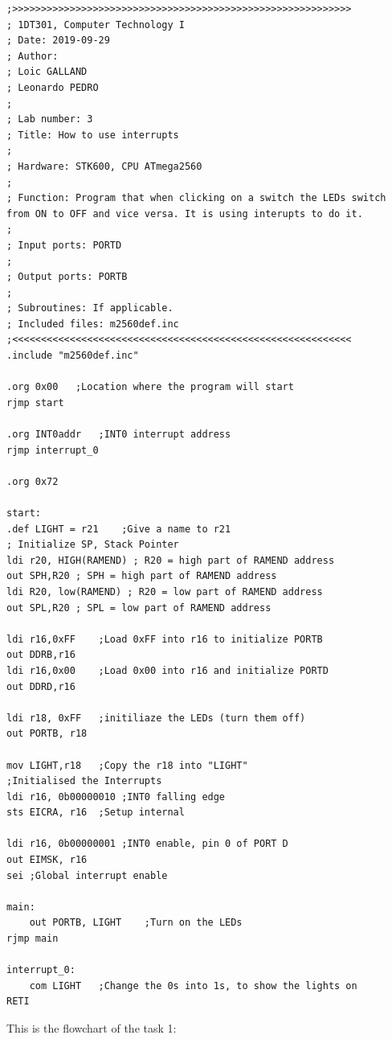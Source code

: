 \documentclass[a4paper,12pt]{article}
\begin{document}
\lstset{style=Asm}
\begin{lstlisting}
;>>>>>>>>>>>>>>>>>>>>>>>>>>>>>>>>>>>>>>>>>>>>>>>>>>>>>>>>>>>
; 1DT301, Computer Technology I
; Date: 2019-09-29
; Author:
; Loic GALLAND
; Leonardo PEDRO
;
; Lab number: 3
; Title: How to use interrupts
;
; Hardware: STK600, CPU ATmega2560
;
; Function: Program that when clicking on a switch the LEDs switch from ON to OFF and vice versa. It is using interupts to do it.
;
; Input ports: PORTD
;
; Output ports: PORTB
;
; Subroutines: If applicable.
; Included files: m2560def.inc
;<<<<<<<<<<<<<<<<<<<<<<<<<<<<<<<<<<<<<<<<<<<<<<<<<<<<<<<<<<<
.include "m2560def.inc"

.org 0x00	;Location where the program will start
rjmp start

.org INT0addr	;INT0 interrupt address
rjmp interrupt_0

.org 0x72

start:
.def LIGHT = r21	;Give a name to r21
; Initialize SP, Stack Pointer
ldi r20, HIGH(RAMEND) ; R20 = high part of RAMEND address
out SPH,R20 ; SPH = high part of RAMEND address
ldi R20, low(RAMEND) ; R20 = low part of RAMEND address
out SPL,R20 ; SPL = low part of RAMEND address

ldi r16,0xFF	;Load 0xFF into r16 to initialize PORTB
out DDRB,r16	
ldi r16,0x00	;Load 0x00 into r16 and initialize PORTD
out DDRD,r16

ldi r18, 0xFF	;initiliaze the LEDs (turn them off)
out PORTB, r18

mov LIGHT,r18	;Copy the r18 into "LIGHT"
;Initialised the Interrupts
ldi r16, 0b00000010	;INT0 falling edge
sts EICRA, r16	;Setup internal 

ldi r16, 0b00000001	;INT0 enable, pin 0 of PORT D
out EIMSK, r16
sei	;Global interrupt enable

main:
	out PORTB, LIGHT	;Turn on the LEDs
rjmp main

interrupt_0:
	com LIGHT	;Change the 0s into 1s, to show the lights on
RETI	
\end{lstlisting}
This is the flowchart of the task 1:
\end{document}
